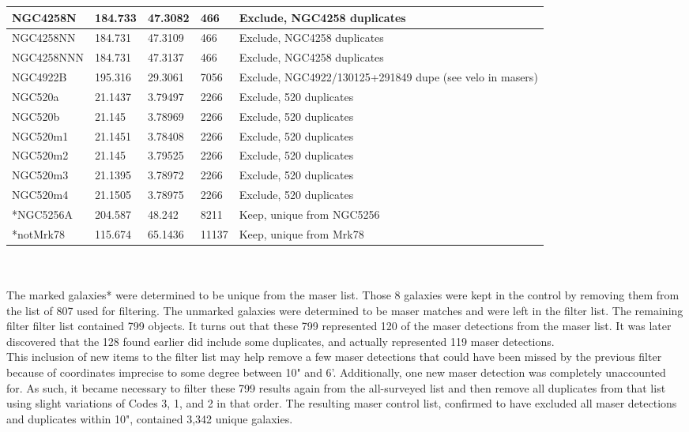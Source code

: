 \documentclass[12pt]{article}
\begin{document}
{\begin{tabular}{|p{3.7cm}|p{1cm}|p{1.1cm}|p{0.6cm}|p{8cm}|}
NGC4258N & 184.733 & 47.3082 & 466 & Exclude, NGC4258 duplicates \\ \hline
NGC4258NN & 184.731 & 47.3109 & 466 & Exclude, NGC4258 duplicates \\ \hline
NGC4258NNN & 184.731 & 47.3137 & 466 & Exclude, NGC4258 duplicates \\ \hline
NGC4922B & 195.316 & 29.3061 & 7056 & Exclude, NGC4922/130125+291849 dupe (see velo in masers) \\ \hline
NGC520a	 & 21.1437 & 3.79497 & 2266 & Exclude, 520 duplicates \\ \hline
NGC520b	 & 21.145 & 3.78969 & 2266 & Exclude, 520 duplicates \\ \hline
NGC520m1 & 21.1451 & 3.78408 & 2266 & Exclude, 520 duplicates \\ \hline
NGC520m2 & 21.145 & 3.79525 & 2266 & Exclude, 520 duplicates \\ \hline
NGC520m3 & 21.1395 & 3.78972 & 2266 & Exclude, 520 duplicates \\ \hline
NGC520m4 & 21.1505 & 3.78975 & 2266 & Exclude, 520 duplicates \\ \hline
*NGC5256A & 204.587 & 48.242 & 8211 & Keep, unique from NGC5256 \\ \hline
*notMrk78 & 115.674 & 65.1436 & 11137 & Keep, unique from Mrk78 \\
  \hline
\end{tabular}}\\ \\

The marked galaxies* were determined to be unique from the maser list. Those 8 galaxies were kept in the control by removing them from the list of 807 used for filtering. The unmarked galaxies were determined to be maser matches and were left in the filter list. The remaining filter filter list contained 799 objects. It turns out that these 799 represented 120 of the maser detections from the maser list. It was later discovered that the 128 found earlier did include some duplicates, and actually represented 119 maser detections.\\

This inclusion of new items to the filter list may help remove a few maser detections that could have been missed by the previous filter because of coordinates imprecise to some degree between 10" and 6'. Additionally, one new maser detection was completely unaccounted for. As such, it became necessary to filter these 799 results again from the all-surveyed list and then remove all duplicates from that list using slight variations of Codes 3, 1, and 2 in that order. The resulting maser control list, confirmed to have excluded all maser detections and duplicates within 10", contained 3,342 unique galaxies.
\end{document}
